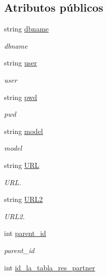 \subsection*{Atributos públicos}
\begin{DoxyCompactItemize}
\item 
string \hyperlink{classestado__proyecto_ad68c2876b60b2507510f01291b6a351e}{dbname}
\begin{DoxyCompactList}\small\item\em dbname \end{DoxyCompactList}\item 
string \hyperlink{classestado__proyecto_a44126a25c5181e9f06b0c831aa4cc2ce}{user}
\begin{DoxyCompactList}\small\item\em user \end{DoxyCompactList}\item 
string \hyperlink{classestado__proyecto_a1dd02106c2ec6c2bba1146e0a4871423}{pwd}
\begin{DoxyCompactList}\small\item\em pwd \end{DoxyCompactList}\item 
string \hyperlink{classestado__proyecto_af1c6ec6fe4c01a1faeab40a61e7e21d4}{model}
\begin{DoxyCompactList}\small\item\em model \end{DoxyCompactList}\item 
string \hyperlink{classestado__proyecto_aeadf1825e0dafa90f3c33e88e17d3d1c}{U\+RL}
\begin{DoxyCompactList}\small\item\em U\+RL. \end{DoxyCompactList}\item 
string \hyperlink{classestado__proyecto_af4cd30e97fc087097e738d2ef1d958c9}{U\+R\+L2}
\begin{DoxyCompactList}\small\item\em U\+R\+L2. \end{DoxyCompactList}\item 
int \hyperlink{classestado__proyecto_a4dfe6545f55e5b6ac0077ad0f1d7e3c9}{parent\+\_\+id}
\begin{DoxyCompactList}\small\item\em parent\+\_\+id \end{DoxyCompactList}\item 
int \hyperlink{classestado__proyecto_a1545134dd661b72333b06cfc9c11ae49}{id\+\_\+la\+\_\+tabla\+\_\+res\+\_\+partner}

\end{DoxyCompactItemize}
